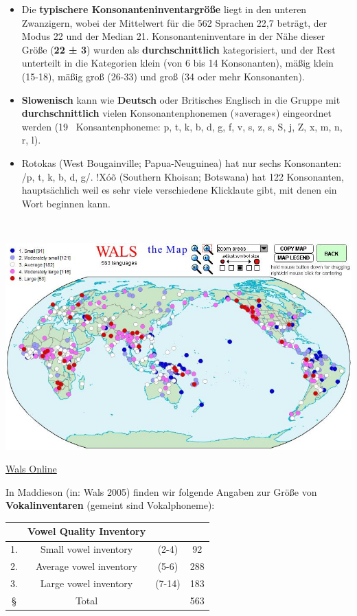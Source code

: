 \documentclass[
  letterpaper,
]{scrbook}
\begin{document}
\begin{itemize}
\item
  Die \textbf{typischere Konsonanteninventargröße} liegt in den unteren
  Zwanzigern, wobei der Mittelwert für die 562 Sprachen 22,7 beträgt,
  der Modus 22 und der Median 21. Konsonanteninventare in der Nähe
  dieser Größe (\textbf{22 ± 3}) wurden als \textbf{durchschnittlich}
  kategorisiert, und der Rest unterteilt in die Kategorien klein (von 6
  bis 14 Konsonanten), mäßig klein (15-18), mäßig groß (26-33) und groß
  (34 oder mehr Konsonanten).
\item
  \textbf{Slowenisch} kann wie \textbf{Deutsch} oder Britisches Englisch
  in die Gruppe mit \textbf{durchschnittlich} vielen Konsonantenphonemen
  (»average«) eingeordnet werden (19~ Konsantenphoneme: p, t, k, b, d,
  g, f, v, s, z, s, S, j, Z, x, m, n, r, l).
\item
  Rotokas (West Bougainville; Papua-Neuguinea) hat nur sechs
  Konsonanten: /p, t, k, b, d, g/. !Xóõ (Southern Khoisan; Botswana) hat
  122 Konsonanten, hauptsächlich weil es sehr viele verschiedene
  Klicklaute gibt, mit denen ein Wort beginnen kann.
\end{itemize}

~

\includegraphics[width=1\textwidth,height=\textheight]{./pictures/01b_NSG_Intro_2020-10-07/wals_consonant_inventories.png}

\href{https://wals.info/}{Wals Online}

In Maddieson (in: Wals 2005) finden wir folgende Angaben zur Größe von
\textbf{Vokalinventaren} (gemeint sind Vokalphoneme):

\begin{longtable}[]{@{}cccc@{}}
\toprule()
~ & \textbf{Vowel Quality Inventory} & ~ & ~ \\
\midrule()
\endhead
1. & Small vowel inventory & (2-4) & 92 \\
2. & Average vowel inventory & (5-6) & 288 \\
3. & Large vowel inventory & (7-14) & 183 \\
§ & Total & ~ & 563 \\
\bottomrule()
\end{longtable}
\end{document}
